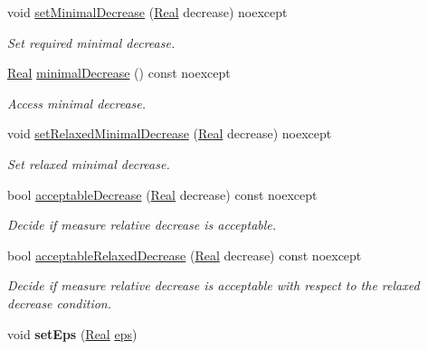 \begin{DoxyCompactItemize}
\item 
void \hyperlink{classSpacy_1_1Mixin_1_1DecreaseCondition_aabc5e2473edace0c87da7fbd9fa0ae61}{set\-Minimal\-Decrease} (\hyperlink{classSpacy_1_1Real}{\-Real} decrease) noexcept
\begin{DoxyCompactList}\small\item\em \-Set required minimal decrease. \end{DoxyCompactList}\item 
\hyperlink{classSpacy_1_1Real}{\-Real} \hyperlink{classSpacy_1_1Mixin_1_1DecreaseCondition_aeeda8b1d9f177fe5dd532e42de09ab44}{minimal\-Decrease} () const noexcept
\begin{DoxyCompactList}\small\item\em \-Access minimal decrease. \end{DoxyCompactList}\item 
void \hyperlink{classSpacy_1_1Mixin_1_1DecreaseCondition_a86d6a8c8fc683c31572fd818a102a362}{set\-Relaxed\-Minimal\-Decrease} (\hyperlink{classSpacy_1_1Real}{\-Real} decrease) noexcept
\begin{DoxyCompactList}\small\item\em \-Set relaxed minimal decrease. \end{DoxyCompactList}\item 
bool \hyperlink{classSpacy_1_1Mixin_1_1DecreaseCondition_a69c0c90daf14fc40461876f71c49ffc2}{acceptable\-Decrease} (\hyperlink{classSpacy_1_1Real}{\-Real} decrease) const noexcept
\begin{DoxyCompactList}\small\item\em \-Decide if measure relative decrease is acceptable. \end{DoxyCompactList}\item 
bool \hyperlink{classSpacy_1_1Mixin_1_1DecreaseCondition_a5ffb5bc008544db96d935a0ca34dcd24}{acceptable\-Relaxed\-Decrease} (\hyperlink{classSpacy_1_1Real}{\-Real} decrease) const noexcept
\begin{DoxyCompactList}\small\item\em \-Decide if measure relative decrease is acceptable with respect to the relaxed decrease condition. \end{DoxyCompactList}\item 
\hypertarget{classSpacy_1_1Mixin_1_1Eps_a6b4c38a60848c0ab665fb3a81e181786}{void {\bfseries set\-Eps} (\hyperlink{classSpacy_1_1Real}{\-Real} \hyperlink{classSpacy_1_1Mixin_1_1Eps_a812b99b0abc1d78a34b4114907f23f52}{eps})}\label{classSpacy_1_1Mixin_1_1Eps_a6b4c38a60848c0ab665fb3a81e181786}


\end{DoxyCompactItemize}
